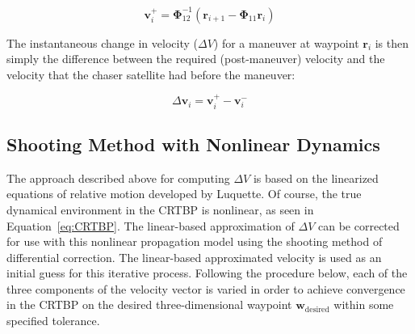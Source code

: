 \documentclass[letterpaper, preprint, paper,11pt]{AAS}	%
\begin{document}

\begin{equation} \label{eq:RequiredVelocity}
	\mathbf{v}_i^+ = \boldsymbol{\Phi}_{12}^{-1}(\mathbf{r}_{i+1} - \boldsymbol{\Phi}_{11}\mathbf{r}_i)
\end{equation}

The instantaneous change in velocity (\(\Delta V\)) for a maneuver at waypoint \(\mathbf{r}_i\) is then simply the difference between the required (post-maneuver) velocity and the velocity that the chaser satellite had before the maneuver:

\begin{equation} \label{eq:DeltaV}
	\Delta \mathbf{v}_i = \mathbf{v}_i^+ - \mathbf{v}_i^-
\end{equation}

\subsection{Shooting Method with Nonlinear Dynamics} \label{sec:shooting}
The approach described above for computing \(\Delta V\) is based on the linearized equations of relative motion developed by Luquette.  Of course, the true dynamical environment in the CRTBP is nonlinear, as seen in Equation~\eqref{eq:CRTBP}. The linear-based approximation of \(\Delta V\) can be corrected for use with this nonlinear propagation model using the shooting method of differential correction.  The linear-based approximated velocity is used as an initial guess for this iterative process.  Following the procedure below, each of the three components of the velocity vector is varied in order to achieve convergence in the CRTBP on the desired three-dimensional waypoint \(\mathbf{w}_{\mathrm{desired}}\) within some specified tolerance.
\end{document}
